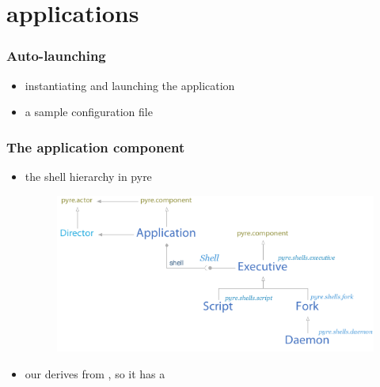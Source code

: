 %
%


\section{applications}


\begin{frame}[fragile]
%
  \frametitle{Auto-launching}
%
  \begin{itemize}
%
  \item instantiating and launching the application
%
%
  \item a sample configuration file
%
%
  \end{itemize}
%
\end{frame}

\begin{frame}[fragile]
%
  \frametitle{The application component}
%
  \begin{itemize}
%
  \item the shell hierarchy in pyre
%
  \begin{figure}
    \includegraphics[scale=1.0]{figures/shells.pdf}
  \end{figure}
%
  \item our  derives from , so it has a
%
  \end{itemize}
%
\end{frame}

